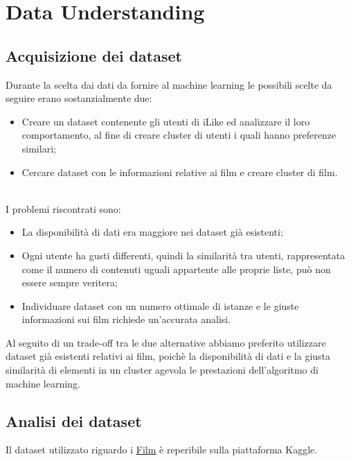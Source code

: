 \documentclass[a4paper, 10pt]{report}
\begin{document}
    \chapter{Data Understanding}\label{ch:data-understanding}

        \section{Acquisizione dei dataset}\label{sec:acquisizione-dei-dataset}
            Durante la scelta dai dati da fornire al machine learning le possibili scelte da seguire erano sostanzialmente due:
            \begin{itemize}
                \item Creare un dataset contenente gli utenti di iLike ed analizzare il loro comportamento, al fine di creare
                cluster di utenti i quali hanno preferenze similari;
                \item Cercare dataset con le informazioni relative ai film e creare cluster di film.
            \end{itemize}\\

            I problemi riscontrati sono:
            \begin{itemize}
                \item La disponibilità di dati era maggiore nei dataset già esistenti;
                \item Ogni utente ha gusti differenti, quindi la similarità tra utenti, rappresentata come il numero di contenuti uguali
                appartente alle proprie liste, può non essere sempre veritera;
                \item Individuare dataset con un numero ottimale di istanze e le giuste informazioni sui film richiede
                un'accurata analisi.
            \end{itemize}
            Al seguito di un trade-off tra le due alternative abbiamo preferito utilizzare dataset già esistenti relativi ai film,
            poichè la disponibilità di dati e la giusta similarità di elementi in un cluster agevola le prestazioni dell'algoritmo
            di machine learning.

        \section{Analisi dei dataset}\label{sec:analisi-dei-dataset}
            Il dataset utilizzato riguardo i \href{https://www.kaggle.com/datasets/stefanoleone992/filmtv-movies-dataset?resource=download}{\underline{Film}}
            è reperibile sulla piattaforma Kaggle.
\end{document}
